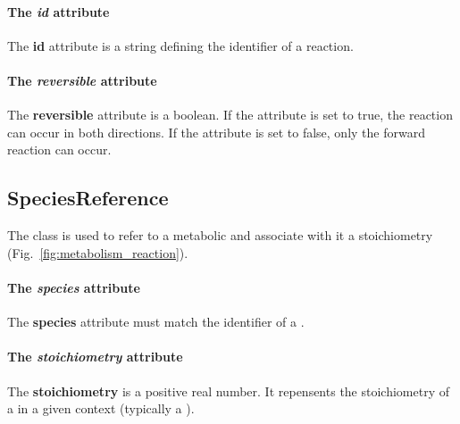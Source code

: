 \paragraph{The \textit{id} attribute}
The \textbf{id} attribute is a string defining the identifier of a reaction.

\paragraph{The \textit{reversible} attribute}
The \textbf{reversible} attribute is a boolean.
If the attribute is set to true, the reaction can occur in both directions.
If the attribute is set to false, only the forward reaction can occur.


\subsection{SpeciesReference}
\label{sec:species_reference}

The \speciesreference{} class is used to refer to a metabolic \species{}
and associate with it a stoichiometry (Fig.~\ref{fig:metabolism_reaction}).

\paragraph{The \textit{species} attribute}
The \textbf{species} attribute must match the identifier of a \species{}.

\paragraph{The \textit{stoichiometry} attribute}
The \textbf{stoichiometry} is a positive real number.
It repensents the stoichiometry of a \species{} in a given context
(typically a \reaction).
